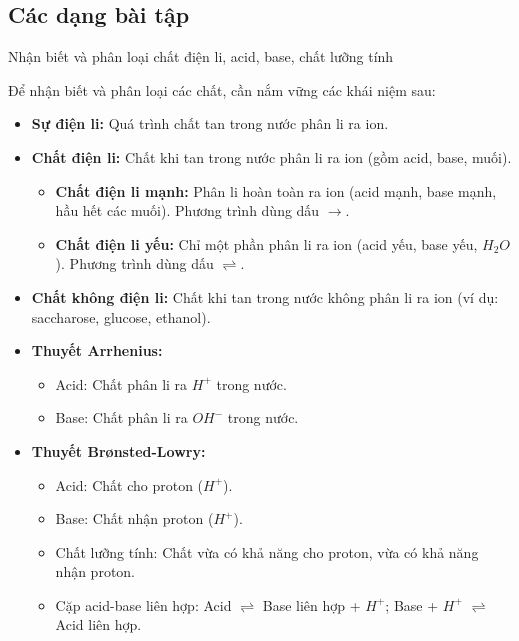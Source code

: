 \subsection{Các dạng bài tập}
\begin{dang}{Nhận biết và phân loại chất điện li, acid, base, chất lưỡng tính}\end{dang}
\begin{phuongphap}
Để nhận biết và phân loại các chất, cần nắm vững các khái niệm sau:
\begin{itemize}
    \item \textbf{Sự điện li:} Quá trình chất tan trong nước phân li ra ion.
    \item \textbf{Chất điện li:} Chất khi tan trong nước phân li ra ion (gồm acid, base, muối).
        \begin{itemize}
	            \item \textbf{Chất điện li mạnh:} Phân li hoàn toàn ra ion (acid mạnh, base mạnh, hầu hết các muối). Phương trình dùng dấu $\rightarrow$.
	            \item \textbf{Chất điện li yếu:} Chỉ một phần phân li ra ion (acid yếu, base yếu, $H_2O$). Phương trình dùng dấu $\rightleftharpoons$.
	        \end{itemize}
    \item \textbf{Chất không điện li:} Chất khi tan trong nước không phân li ra ion (ví dụ: saccharose, glucose, ethanol).
    \item \textbf{Thuyết Arrhenius:}
        \begin{itemize}
	            \item Acid: Chất phân li ra $H^+$ trong nước.
	            \item Base: Chất phân li ra $OH^-$ trong nước.
	        \end{itemize}
    \item \textbf{Thuyết Brønsted-Lowry:}
        \begin{itemize}
	            \item Acid: Chất cho proton ($H^+$).
	            \item Base: Chất nhận proton ($H^+$).
	            \item Chất lưỡng tính: Chất vừa có khả năng cho proton, vừa có khả năng nhận proton.
	            \item Cặp acid-base liên hợp: Acid $\rightleftharpoons$ Base liên hợp + $H^+$; Base + $H^+$ $\rightleftharpoons$ Acid liên hợp.
	        \end{itemize}
\end{itemize}
\end{phuongphap}

